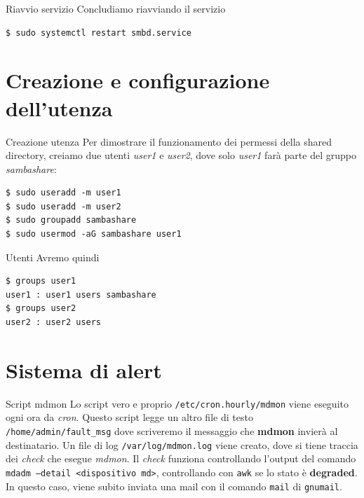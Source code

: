 \documentclass{beamer}
\begin{document}
\begin{frame}[fragile]{Riavvio servizio}
Concludiamo riavviando il servizio
\begin{verbatim}
$ sudo systemctl restart smbd.service
\end{verbatim}
\end{frame}

\section{Creazione e configurazione dell'utenza}

\begin{frame}[fragile]{Creazione utenza}
Per dimostrare il funzionamento dei permessi della shared directory, creiamo due utenti \textit{user1} e \textit{user2}, dove solo \textit{user1} farà parte del gruppo \textit{sambashare}:
\begin{verbatim}
$ sudo useradd -m user1
$ sudo useradd -m user2
$ sudo groupadd sambashare
$ sudo usermod -aG sambashare user1
\end{verbatim}
\end{frame}

\begin{frame}[fragile]{Utenti}
Avremo quindi
\begin{verbatim}
$ groups user1
user1 : user1 users sambashare
$ groups user2
user2 : user2 users
\end{verbatim}
\end{frame}


\section{Sistema di alert}

\begin{frame}[fragile]{Script mdmon}
Lo script vero e proprio \texttt{/etc/cron.hourly/mdmon} viene eseguito ogni ora da \textit{cron}. Questo script legge un altro file di testo \texttt{/home/admin/fault\_msg} dove scriveremo il messaggio che \textbf{mdmon} invierà al destinatario. Un file di log \texttt{/var/log/mdmon.log} viene creato, dove si tiene traccia dei \textit{check} che esegue \textit{mdmon}. Il \textit{check} funziona controllando l'output del comando \texttt{mdadm --detail <dispositivo md>}, controllando con \texttt{awk} se lo stato è \textbf{degraded}. In questo caso, viene subito inviata una mail con il comando \texttt{mail} di \texttt{gnumail}.
\end{frame}
\end{document}
